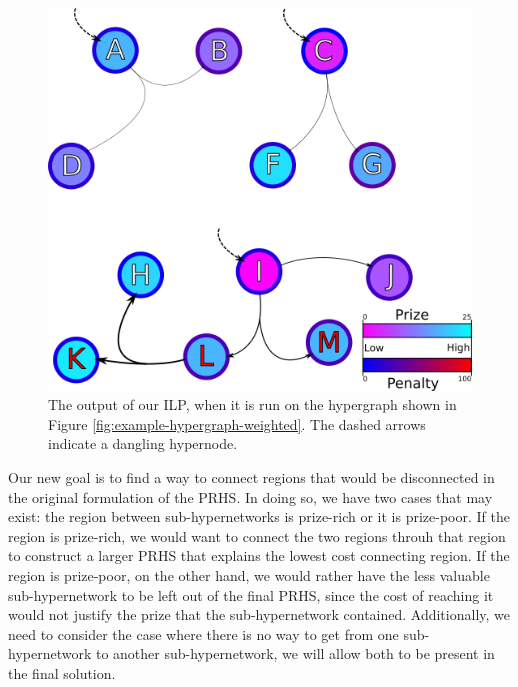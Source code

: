 \documentclass[12pt,twoside]{reedthesis}
\theoremstyle{definition}
\begin{document}
\begin{figure}[hp]
  \begin{center}
    \includegraphics{example-hypergraph-weighted-after-ILP}
  \caption[Output from ILP with disconnected sub-hypergraphs]{The output of our ILP, when it is run on the hypergraph shown in Figure \ref{fig:example-hypergraph-weighted}. The dashed arrows indicate a dangling hypernode.}
  \label{fig:example-hypergraph-weighted-after-ILP}
  \end{center}
\end{figure}

Our new goal is to find a way to connect regions that would be disconnected in the original formulation of the PRHS. In doing so, we have two cases that may exist: the region between sub-hypernetworks is prize-rich or it is prize-poor. If the region is prize-rich, we would want to connect the two regions throuh that region to construct a larger PRHS that explains the lowest cost connecting region. If the region is prize-poor, on the other hand, we would rather have the less valuable sub-hypernetwork to be left out of the final PRHS, since the cost of reaching it would not justify the prize that the sub-hypernetwork contained. Additionally, we need to consider the case where there is no way to get from one sub-hypernetwork to another sub-hypernetwork, we will allow both to be present in the final solution.\par
\end{document}
